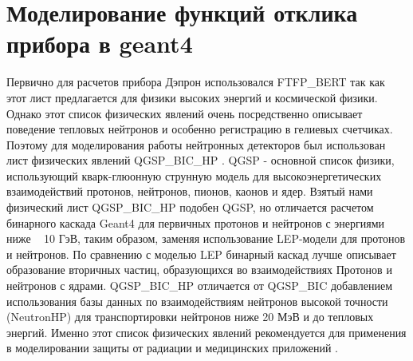 %					
%						


\section{Моделирование функций отклика прибора в geant4}

Первично для расчетов прибора Дэпрон использовался FTFP\_BERT так как этот лист предлагается для физики высоких энергий и космической физики. Однако этот список физических явлений очень посредственно описывает поведение тепловых нейтронов и особенно регистрацию в гелиевых счетчиках.
Поэтому для моделирования работы нейтронных детекторов был использован лист физических явлений QGSP\_BIC\_HP \cite{Wright2007}. QGSP - основной список физики, использующий кварк-глюонную струнную модель для высокоэнергетических взаимодействий протонов, нейтронов, пионов, каонов и ядер.  Взятый нами физический лист QGSP\_BIC\_HP подобен QGSP, но отличается расчетом бинарного каскада Geant4 для первичных протонов и нейтронов с энергиями ниже ~ 10 ГэВ, таким образом, заменяя использование LEP-модели для протонов и нейтронов. По сравнению с моделью LEP бинарный каскад лучше описывает образование вторичных частиц, образующихся во взаимодействиях Протонов и нейтронов с ядрами. QGSP\_BIC\_HP отличается от QGSP\_BIC добавлением использования базы данных по взаимодействиям нейтронов высокой точности (NeutronHP) для транспортировки нейтронов ниже 20 МэВ и до тепловых энергий. Именно этот список физических явлений рекомендуется для применения в моделировании защиты от радиации и медицинских приложений \cite{Wright2007}.

